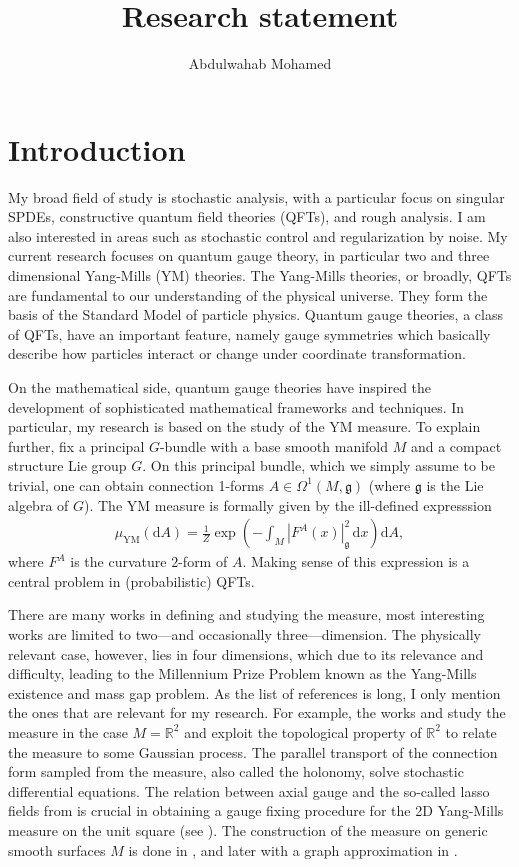 \documentclass[11pt]{article}
\title{Research statement}
\author{Abdulwahab Mohamed}
\numberwithin{equation}{section}
\theoremstyle{definition}
\theoremstyle{remark}
\newcommand{\diff}{\mathrm{d}}
\newcommand{\R}{\mathbb R}
\newcommand{\1}{\mathbf 1}
\newcommand{\<}{\langle}
\renewcommand{\>}{\rangle}
\begin{document}
\maketitle


\section{Introduction}
My broad field of study is stochastic analysis, with a particular focus on singular SPDEs, constructive quantum field theories (QFTs), and rough analysis. I am also interested in  areas such as stochastic control and regularization by noise.
%
My current research focuses on quantum gauge theory, in particular two and three dimensional Yang-Mills (YM) theories. The Yang-Mills theories, or broadly,   QFTs are fundamental to our understanding of the physical universe. They form the basis of the Standard Model of particle physics. Quantum gauge theories, a class of QFTs, have an important feature, namely gauge symmetries which basically describe how particles interact or change under coordinate transformation. 

On the mathematical side, quantum gauge theories have inspired the development of sophisticated mathematical frameworks and techniques. In particular, my research is based on the study of the YM measure. To explain further, fix a principal $G$-bundle with a base smooth manifold $M$ and a compact structure Lie group $G$. On this principal bundle, which we simply assume to be trivial, one can obtain connection 1-forms $A\in \Omega^1(M,\mathfrak g)$ (where  $\mathfrak g$ is the Lie algebra of $G$).  The YM measure  is formally given by the ill-defined expresssion
\begin{align}\label{eq:YM_measure}
\mu_{\mathrm{YM}}(\diff A)=\frac 1 Z\exp\left(-\int_{M}|F^A(x)|_{\mathfrak g}^2\,\diff x\right)\diff A,
\end{align}
where $F^A$ is the curvature $2$-form of $A$. Making sense of this expression is a central problem in (probabilistic) QFTs. 

There are many works in defining and studying the measure, most interesting works are limited to two—and occasionally three—dimension. The physically relevant case, however, lies in four dimensions, which due to its relevance and difficulty, leading to the Millennium Prize Problem known as the Yang-Mills existence and mass gap problem. As the list of references is long, I only mention the ones that are relevant for my research.  For example, the works \cite{Driver89} and \cite{GKS89} study the measure in the case $M=\R^2$ and exploit the topological property of $\R^2$ to relate the measure to some Gaussian process. The parallel transport of the connection form sampled from the measure, also called the holonomy, solve stochastic differential equations. 
%
%
The relation between axial gauge and the so-called lasso fields from \cite{Driver89} is crucial in obtaining a gauge fixing procedure for the 2D Yang-Mills measure on the unit square (see ). The construction of the measure on generic smooth surfaces $M$ is done in  \cite{Sengupta97}, and later with a graph approximation in \cite{Levy03}. 
\end{document}
